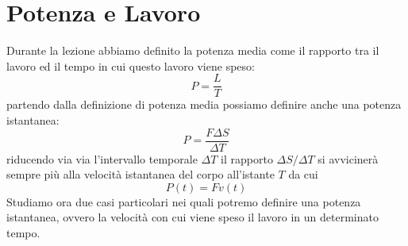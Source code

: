 \documentclass[a4paper,10pt,oneside]{article}
\begin{document}
 \section*{Potenza e Lavoro}
Durante la lezione abbiamo definito la potenza media come il rapporto tra il lavoro ed il tempo in cui questo lavoro viene speso:
\begin{equation}\label{p_media}
 P=\frac{L}{T}
\end{equation}
partendo dalla definizione di potenza media possiamo definire anche una potenza istantanea:
\begin{equation}
 P=\frac{F\Delta S}{\Delta T}
\end{equation}
riducendo via via l'intervallo temporale $\Delta T$ il rapporto $\Delta S /\Delta T$ si avvicinerà sempre più alla velocità istantanea del corpo all'istante $T$
da cui
\begin{equation}
 P(t)=Fv(t)
\end{equation}
Studiamo ora due casi particolari nei quali potremo definire una potenza istantanea, ovvero la velocità con cui viene speso il lavoro in un determinato tempo.
\end{document}
